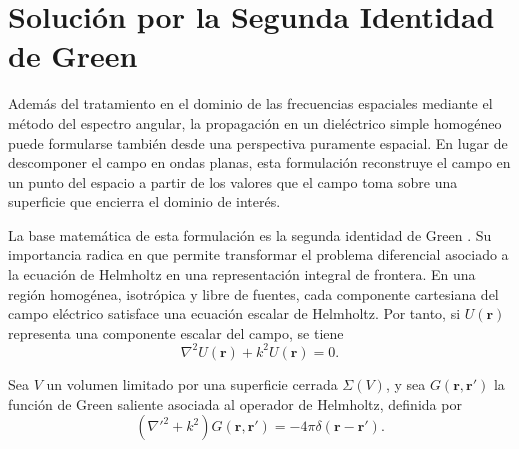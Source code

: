 \section{Solución por la Segunda Identidad de Green}


Además del tratamiento en el dominio de las frecuencias espaciales mediante el método del espectro angular, la propagación en un dieléctrico simple homogéneo puede formularse también desde una perspectiva puramente espacial. En lugar de descomponer el campo en ondas planas, esta formulación reconstruye el campo en un punto del espacio a partir de los valores que el campo toma sobre una superficie que encierra el dominio de interés.

La base matemática de esta formulación es la segunda identidad de Green \cite{arfken2013}. Su importancia radica en que permite transformar el problema diferencial asociado a la ecuación de Helmholtz en una representación integral de frontera. En una región homogénea, isotrópica y libre de fuentes, cada componente cartesiana del campo eléctrico satisface una ecuación escalar de Helmholtz. Por tanto, si \(U(\mathbf r)\) representa una componente escalar del campo, se tiene
\begin{equation}
\nabla^2 U(\mathbf r)+k^2U(\mathbf r)=0.
\label{eq:scalar_Helmholtz_equation}
\end{equation}

Sea \(V\) un volumen limitado por una superficie cerrada \(\Sigma(V)\), y sea \(G(\mathbf r,\mathbf r')\) la función de Green saliente asociada al operador de Helmholtz, definida por
\begin{equation}
\left(\nabla'^2+k^2\right)G(\mathbf r,\mathbf r')
=
-4\pi\delta(\mathbf r-\mathbf r').
\label{eq:Green_function_Helmholtz}
\end{equation}

